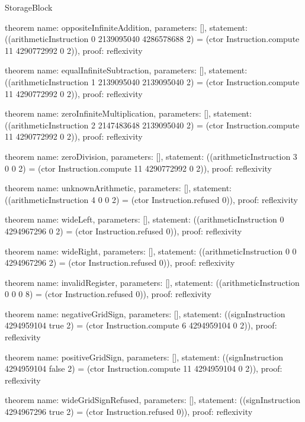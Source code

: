 \begin{lexlean}{StorageBlock}
\begin{semanticmodule}
theorem{
  name: oppositeInfiniteAddition,
  parameters: [],
  statement: ((arithmeticInstruction 0 2139095040 4286578688 2) = (ctor Instruction.compute 11 4290772992 0 2)),
  proof: reflexivity{}
}

theorem{
  name: equalInfiniteSubtraction,
  parameters: [],
  statement: ((arithmeticInstruction 1 2139095040 2139095040 2) = (ctor Instruction.compute 11 4290772992 0 2)),
  proof: reflexivity{}
}

theorem{
  name: zeroInfiniteMultiplication,
  parameters: [],
  statement: ((arithmeticInstruction 2 2147483648 2139095040 2) = (ctor Instruction.compute 11 4290772992 0 2)),
  proof: reflexivity{}
}

theorem{
  name: zeroDivision,
  parameters: [],
  statement: ((arithmeticInstruction 3 0 0 2) = (ctor Instruction.compute 11 4290772992 0 2)),
  proof: reflexivity{}
}

theorem{
  name: unknownArithmetic,
  parameters: [],
  statement: ((arithmeticInstruction 4 0 0 2) = (ctor Instruction.refused 0)),
  proof: reflexivity{}
}

theorem{
  name: wideLeft,
  parameters: [],
  statement: ((arithmeticInstruction 0 4294967296 0 2) = (ctor Instruction.refused 0)),
  proof: reflexivity{}
}

theorem{
  name: wideRight,
  parameters: [],
  statement: ((arithmeticInstruction 0 0 4294967296 2) = (ctor Instruction.refused 0)),
  proof: reflexivity{}
}

theorem{
  name: invalidRegister,
  parameters: [],
  statement: ((arithmeticInstruction 0 0 0 8) = (ctor Instruction.refused 0)),
  proof: reflexivity{}
}

theorem{
  name: negativeGridSign,
  parameters: [],
  statement: ((signInstruction 4294959104 true 2) = (ctor Instruction.compute 6 4294959104 0 2)),
  proof: reflexivity{}
}

theorem{
  name: positiveGridSign,
  parameters: [],
  statement: ((signInstruction 4294959104 false 2) = (ctor Instruction.compute 11 4294959104 0 2)),
  proof: reflexivity{}
}

theorem{
  name: wideGridSignRefused,
  parameters: [],
  statement: ((signInstruction 4294967296 true 2) = (ctor Instruction.refused 0)),
  proof: reflexivity{}
}
\end{semanticmodule}
\end{lexlean}
